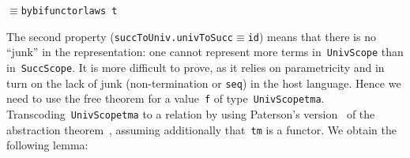 \documentclass[9pt,authoryear]{sigplanconf}
\begin{document}
{{}\vphantom{$\{$}}\texttt{\mbox{\hspace{0.50em}}}\texttt{$ \equiv $}\texttt{\mbox{\hspace{0.50em}}}\texttt{\makebox[1.22ex][l]{\{{}}\makebox[1.22ex][c]{-}\mbox{\hspace{0.50em}}by\mbox{\hspace{0.50em}}\makebox[1.22ex][l]{$ {(} $}bi\makebox[1.22ex][r]{$ {)} $}functor\mbox{\hspace{0.50em}}laws\mbox{\hspace{0.50em}}\makebox[1.22ex][c]{-}\makebox[1.22ex][r]{\}{}}}\texttt{{\nopagebreak \newline%
}\vphantom{$\{$}}\texttt{\mbox{\hspace{0.50em}}}\texttt{\mbox{\hspace{0.50em}}}\texttt{\mbox{\hspace{0.50em}}}\texttt{t}\texttt{{\nopagebreak \newline%
}\vphantom{$\{$}}%


%
%


%
The second property (\texttt{succToUniv}\texttt{\mbox{\hspace{0.50em}}}\texttt{.}\texttt{\mbox{\hspace{0.50em}}}\texttt{univToSucc}\texttt{\mbox{\hspace{0.50em}}}\texttt{$ \equiv $}\texttt{\mbox{\hspace{0.50em}}}\texttt{id}) means that
    there is no {``}junk{''} in the representation{:} one cannot represent
    more terms in{~}\texttt{UnivScope} than in{~}\texttt{SuccScope}. It is more
    difficult to prove, as it relies on parametricity and in turn
    on the lack of junk (non-termination or \texttt{seq}) in the host
    language. Hence we need to use the free theorem for a value{~}\texttt{f}    of type{~}\texttt{UnivScope}\texttt{\mbox{\hspace{0.50em}}}\texttt{tm}\texttt{\mbox{\hspace{0.50em}}}\texttt{a}. Transcoding{~}\texttt{UnivScope}\texttt{\mbox{\hspace{0.50em}}}\texttt{tm}\texttt{\mbox{\hspace{0.50em}}}\texttt{a} to a
    relation by using Paterson{'}s version{~}\cite{fegaras_revisiting_1996}    of the abstraction theorem{~}\cite{reynolds-83,bernardy_proofs_2012},
    assuming additionally that{~}\texttt{tm} is a functor. We obtain the
    following lemma{:}%


%
%
\end{document}

